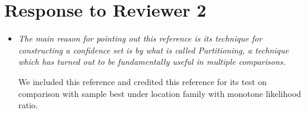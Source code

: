 \documentclass[]{article}
\theoremstyle{remark}
\begin{document}
\section{Response to Reviewer 2}

\begin{itemize}

\item {\em The main reason for pointing out this reference is its technique for constructing a confidence set is by what is called Partitioning, a technique which has turned out to be fundamentally useful in multiple comparisons.}

We included this reference and credited this reference for its test on comparison with sample best under location family with monotone likelihood ratio.

\end{itemize}



\end{document}
